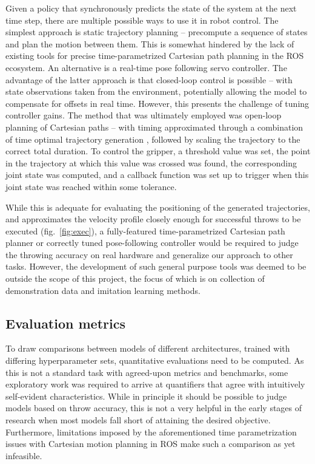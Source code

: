 \documentclass{article}
\begin{document}
Given a policy that synchronously predicts the state of the system at the next time step, there are multiple possible ways to use it in robot control. The simplest approach is static trajectory planning -- precompute a sequence of states and plan the motion between them. This is somewhat hindered by the lack of existing tools for precise time-parametrized Cartesian path planning in the ROS ecosystem. An alternative is a real-time pose following servo controller. The advantage of the latter approach is that closed-loop control is possible -- with state observations taken from the environment, potentially allowing the model to compensate for offsets in real time. However, this presents the challenge of tuning controller gains. The method that was ultimately employed was open-loop planning of Cartesian paths -- with timing approximated through a combination of time optimal trajectory generation \citep{kunz2012time}, followed by scaling the trajectory to the correct total duration. To control the gripper, a threshold value was set, the point in the trajectory at which this value was crossed was found, the corresponding joint state was computed, and a callback function was set up to trigger when this joint state was reached within some tolerance.

While this is adequate for evaluating the positioning of the generated trajectories, and approximates the velocity profile closely enough for successful throws to be executed (fig.~\ref{fig:exec}), a fully-featured time-parametrized Cartesian path planner or correctly tuned pose-following controller would be required to judge the throwing accuracy on real hardware and generalize our approach to other tasks. However, the development of such general purpose tools was deemed to be outside the scope of this project, the focus of which is on collection of demonstration data and imitation learning methods.

\subsection{Evaluation metrics}
\label{sec:eval}

To draw comparisons between models of different architectures, trained with differing hyperparameter sets, quantitative evaluations need to be computed. As this is not a standard task with agreed-upon metrics and benchmarks, some exploratory work was required to arrive at quantifiers that agree with intuitively self-evident characteristics. While in principle it should be possible to judge models based on throw accuracy, this is not a very helpful in the early stages of research when most models fall short of attaining the desired objective. Furthermore, limitations imposed by the aforementioned time parametrization issues with Cartesian motion planning in ROS make such a comparison as yet infeasible.
\end{document}
